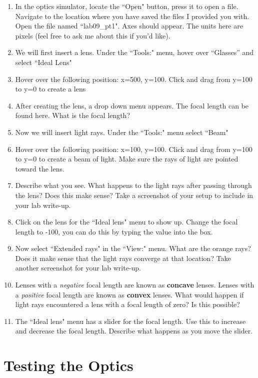 \documentclass[12pt]{article}%
\begin{document}
\newpage
\begin{enumerate}
           \item In the optics simulator, locate the ``Open" button, press it to open a file. Navigate to the location where you have saved the files I provided you with. Open the file named ``lab09\_pt1". Axes should appear. The units here are pixels (feel free to ask me about this if you'd like).
           \item We will first insert a lens. Under the ``Tools:" menu, hover over ``Glasses'' and select ``Ideal Lens"
           \item Hover over the following position: x=500, y=100. Click and drag from y=100 to y=0 to create a lens
           \item After creating the lens, a drop down menu appears. The focal length can be found here. What is the focal length? 
           \item Now we will insert light rays. Under the ``Tools:" menu select ``Beam"
           \item Hover over the following position: x=100, y=100. Click and drag from y=100 to y=0 to create a beam of light. Make sure the rays of light are pointed toward the lens.
           \item Describe what you see. What happens to the light rays after passing through the lens? Does this make sense? Take a screenshot of your setup to include in your lab write-up.
           \item Click on the lens for the ``Ideal lens" menu to show up. Change the focal length to -100, you can do this by typing the value into the box.
           \item Now select ``Extended rays" in the ``View:" menu. What are the orange rays? Does it make sense that the light rays converge at that location? Take another screenshot for your lab write-up.
           \item Lenses with a \textit{negative} focal length are known as \textbf{concave} lenses. Lenses with a \textit{positive} focal length are known as \textbf{convex} lenses. What would happen if light rays encountered a lens with a focal length of zero? Is this possible?
           \item The ``Ideal lens" menu has a slider for the focal length. Use this to increase and decrease the focal length. Describe what happens as you move the slider.
\end{enumerate}
 
\section{Testing the Optics}
 
\end{document}
